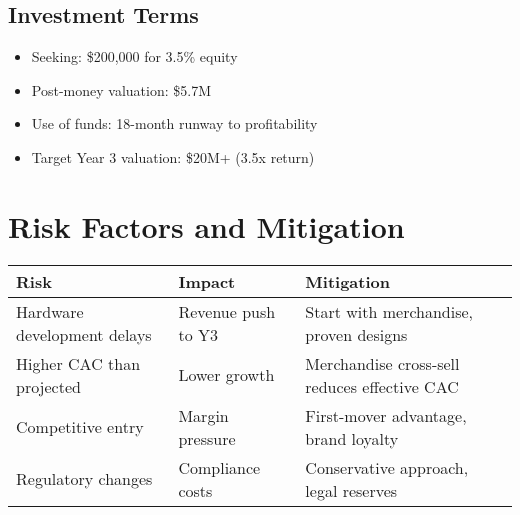 \documentclass[11pt]{article}
\begin{document}
\subsection{Investment Terms}
\begin{itemize}
  \item Seeking: \$200,000 for 3.5\% equity
  \item Post-money valuation: \$5.7M
  \item Use of funds: 18-month runway to profitability
  \item Target Year 3 valuation: \$20M+ (3.5x return)
\end{itemize}

\section{Risk Factors and Mitigation}

\begin{table}[htbp]
\centering
\begin{tabularx}{\linewidth}{l X X}
\toprule
Risk & Impact & Mitigation \\\midrule
Hardware development delays & Revenue push to Y3 & Start with merchandise, proven designs \\
Higher CAC than projected & Lower growth & Merchandise cross-sell reduces effective CAC \\
Competitive entry & Margin pressure & First-mover advantage, brand loyalty \\
Regulatory changes & Compliance costs & Conservative approach, legal reserves \\
\bottomrule
\end{tabularx}
\end{table}
\end{document}
